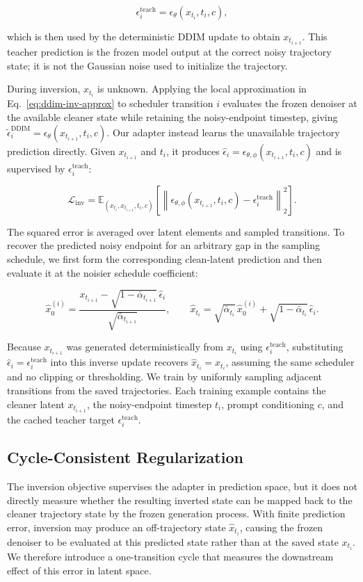 \documentclass{article} %
\begin{document}
\[ \epsilon_i^{\mathrm{teach}}=\epsilon_\theta(x_{t_i},t_i,c), \]

which is then used by the deterministic DDIM update to obtain $x_{t_{i+1}}$. This teacher prediction is the frozen model output at the correct noisy trajectory state; it is not the Gaussian noise used to initialize the trajectory.

During inversion, $x_{t_i}$ is unknown. Applying the local approximation in Eq.~\eqref{eq:ddim-inv-approx} to scheduler transition $i$ evaluates the frozen denoiser at the available cleaner state while retaining the noisy-endpoint timestep, giving $\tilde{\epsilon}_i^{\mathrm{DDIM}}=\epsilon_\theta(x_{t_{i+1}},t_i,c)$. Our adapter instead learns the unavailable trajectory prediction directly. Given $x_{t_{i+1}}$ and $t_i$, it produces $\hat{\epsilon}_i=\epsilon_{\theta,\phi}(x_{t_{i+1}},t_i,c)$ and is supervised by $\epsilon_i^{\mathrm{teach}}$:

\[ \mathcal{L}_{\mathrm{inv}}=\mathbb{E}_{(x_{t_i},x_{t_{i+1}},t_i,c)}\left[\left\|\epsilon_{\theta,\phi}(x_{t_{i+1}},t_i,c)-\epsilon_i^{\mathrm{teach}}\right\|_2^2\right]. \]

The squared error is averaged over latent elements and sampled transitions. To recover the predicted noisy endpoint for an arbitrary gap in the sampling schedule, we first form the corresponding clean-latent prediction and then evaluate it at the noisier schedule coefficient:

\[ \hat{x}_0^{(i)}=\frac{x_{t_{i+1}}-\sqrt{1-\bar{\alpha}_{t_{i+1}}}\,\hat{\epsilon}_i}{\sqrt{\bar{\alpha}_{t_{i+1}}}}, \qquad \hat{x}_{t_i}=\sqrt{\bar{\alpha}_{t_i}}\,\hat{x}_0^{(i)}+\sqrt{1-\bar{\alpha}_{t_i}}\,\hat{\epsilon}_i. \]

Because $x_{t_{i+1}}$ was generated deterministically from $x_{t_i}$ using $\epsilon_i^{\mathrm{teach}}$, substituting $\hat{\epsilon}_i=\epsilon_i^{\mathrm{teach}}$ into this inverse update recovers $\hat{x}_{t_i}=x_{t_i}$, assuming the same scheduler and no clipping or thresholding. We train by uniformly sampling adjacent transitions from the saved trajectories. Each training example contains the cleaner latent $x_{t_{i+1}}$, the noisy-endpoint timestep $t_i$, prompt conditioning $c$, and the cached teacher target $\epsilon_i^{\mathrm{teach}}$.

\subsection{Cycle-Consistent Regularization}
\label{sec:cycle-objective}
The inversion objective supervises the adapter in prediction space, but it does not directly measure whether the resulting inverted state can be mapped back to the cleaner trajectory state by the frozen generation process. With finite prediction error, inversion may produce an off-trajectory state $\hat{x}_{t_i}$, causing the frozen denoiser to be evaluated at this predicted state rather than at the saved state $x_{t_i}$. We therefore introduce a one-transition cycle that measures the downstream effect of this error in latent space.
\end{document}
